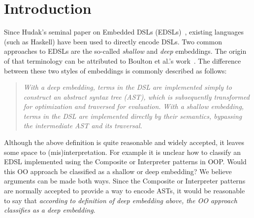 \section{Introduction}

Since Hudak's seminal paper on Embedded DSLs (EDSLs)~\cite{hudak1998modular}, existing
languages (such as Haskell) have been used to directly encode
DSLs. Two common approaches to EDSLs are the so-called \emph{shallow}
and \emph{deep} embeddings. The origin of that terminology can be
attributed to Boulton et al.'s work~\cite{Boulton92dsl}. The difference between these
two styles of embeddings is commonly described as follows:

\begin{quote}
\emph{With a deep embedding, terms in the DSL are implemented simply to
construct an abstract syntax tree (AST), which is subsequently
transformed for optimization and traversed for evaluation. With a
shallow embedding, terms in the DSL are implemented directly by
their semantics, bypassing the intermediate AST and its traversal.}\cite{gibbons2014folding}
\end{quote}


Although the above definition is quite reasonable and widely accepted,
it leaves some space to (mis)interpretation. For example it is unclear 
how to classify an EDSL implemented using the {\sc Composite} or {\sc Interpreter} 
patterns in OOP. Would this OO approach be
classified as a shallow or deep embedding? We believe arguments can be
made both ways. Since the {\sc Composite} or {\sc Interpreter}
patterns are normally accepted to provide a way to encode ASTs, it would be
reasonable to say that \emph{according to definition of deep embedding
  above, the OO approach classifies as a deep
  embedding}. 

